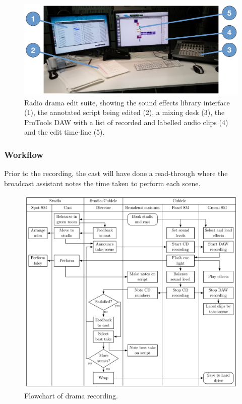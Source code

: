 \begin{figure}[ht]
  \centering
  \includegraphics[width=\columnwidth]{figs/drama-edit-labelled.pdf}
  \caption{Radio drama edit suite, showing the sound effects library interface (1), the annotated script being edited (2), a mixing desk (3), the ProTools DAW with a list of recorded and labelled audio clips (4) and the edit time-line (5).}
  \label{fig:drama-edit}
\end{figure}

\subsubsection{Workflow}
Prior to the recording, the cast will have done a read-through where the broadcast assistant notes the time taken to
perform each scene.

\begin{figure}[ht]
  \centering
  \includegraphics[width=5in]{figs/drama-recording-workflow.pdf}
  \caption{Flowchart of drama recording.}
  \label{fig:ethno-drama-recording}
\end{figure}

